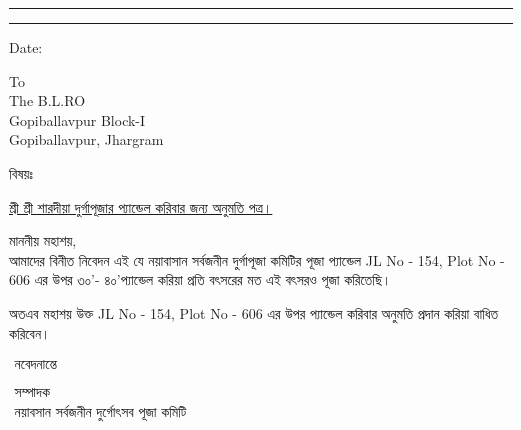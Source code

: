 \begin{center}
    \myheader
\end{center}
\hrule \vspace*{2pt} \hrule  \vspace*{20pt}
\begin{adjustwidth}{15mm}{15mm}\large
    \begin{flushright}
        Date: \underline{\datecontainer}
    \end{flushright}\large\vspace{1cm}

    \noindent To\\
    The B.L.RO\\
    Gopiballavpur Block-I\\
    Gopiballavpur, Jhargram

    \vspace{.5cm}

    \noindent\begin{minipage}{.1\textwidth}বিষয়ঃ
    \end{minipage}\begin{minipage}{.8\textwidth}
        \underline{
            শ্রী শ্রী শারদীয়া দুর্গাপূজার প্যান্ডেল করিবার জন্য অনুমতি পত্র।
        }
    \end{minipage}
    \vspace{.5cm}

    \noindent মাননীয় মহাশয়,\\
    \hspace*{1.5cm}
    আমাদের বিনীত নিবেদন এই যে নয়াবাসান সর্বজনীন দুর্গাপূজা কমিটির পূজা প্যান্ডেল JL No - 154, Plot No - 606 এর উপর ৩০'- ৪০'প্যান্ডেল করিয়া প্রতি বৎসরের মত এই বৎসরও পূজা করিতেছি।

    \hspace{2cm}
    অতএব মহাশয় উক্ত JL No - 154, Plot No - 606 এর উপর প্যান্ডেল করিবার অনুমতি প্রদান করিয়া বাধিত করিবেন। \\


    \vspace{2ex}
    \begin{flushright}
        $\begin{array}{c}
                \mbox{নবেদনান্তে}
                \\ \\ \\
                \mbox{সম্পাদক} \\\mbox{নয়াবসান সর্বজনীন দুর্গোৎসব পূজা কমিটি}\end{array}$
    \end{flushright}
\end{adjustwidth}

